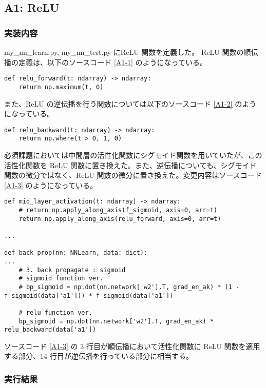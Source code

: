 \documentclass[a4paper,dvipdfmx]{jsarticle}
\begin{document}
\subsection*{A1: ReLU}

\subsubsection*{実装内容}

my\_nn\_learn.py, my\_nn\_test.py にReLU 関数を定義した。
ReLU 関数の順伝播の定義は、以下のソースコード \ref{A1-1} のようになっている。

\begin{lstlisting}[caption="ReLU 関数(順伝播)",label=A1-1]
def relu_forward(t: ndarray) -> ndarray:
    return np.maximum(t, 0)
\end{lstlisting}

また、ReLU の逆伝播を行う関数については以下のソースコード \ref{A1-2} のようになっている。

\begin{lstlisting}[caption="ReLU 関数(逆伝播)",label=A1-2]
def relu_backward(t: ndarray) -> ndarray:
    return np.where(t > 0, 1, 0)
\end{lstlisting}

必須課題においては中間層の活性化関数にシグモイド関数を用いていたが、この活性化関数を ReLU 関数に置き換えた。また、逆伝播についても、シグモイド関数の微分ではなく、ReLU 関数の微分に置き換えた。変更内容はソースコード \ref{A1-3} のようになっている。

\begin{lstlisting}[caption="中間層の変更内容",label=A1-3]
def mid_layer_activation(t: ndarray) -> ndarray:
    # return np.apply_along_axis(f_sigmoid, axis=0, arr=t)
    return np.apply_along_axis(relu_forward, axis=0, arr=t)

...

def back_prop(nn: NNLearn, data: dict):
...
    # 3. back propagate : sigmoid
    # sigmoid function ver.
    # bp_sigmoid = np.dot(nn.network['w2'].T, grad_en_ak) * (1 - f_sigmoid(data['a1'])) * f_sigmoid(data['a1'])

    # relu function ver.
    bp_sigmoid = np.dot(nn.network['w2'].T, grad_en_ak) * relu_backward(data['a1'])
\end{lstlisting}

ソースコード \ref{A1-3} の 3 行目が順伝播において活性化関数に ReLU 関数を適用する部分、14 行目が逆伝播を行っている部分に相当する。

\subsubsection*{実行結果}
\end{document}

